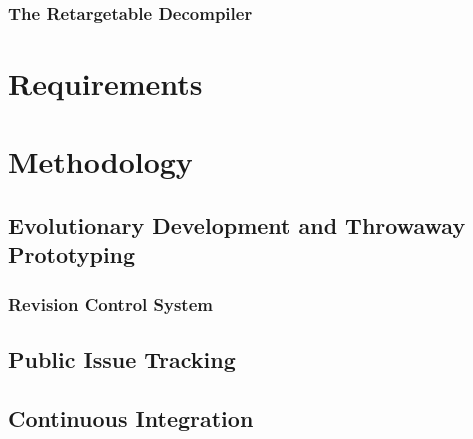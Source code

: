 \documentclass[12pt, a4paper]{article}
\begin{document}

\subsubsection{The Retargetable Decompiler}

\cite{retargetable_decomp}



\section{Requirements}


\section{Methodology}


\subsection{Evolutionary Development and Throwaway Prototyping}


\subsubsection{Revision Control System}


\subsection{Public Issue Tracking}


\subsection{Continuous Integration}
\end{document}
